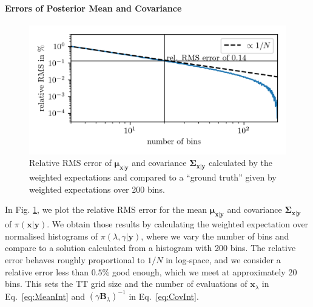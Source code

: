 \paragraph{Errors of Posterior Mean and Covariance}
\begin{figure}[ht!]
	\centering
	\includegraphics{relErrO3MeanVar.png}
	\caption[Relative Error of full posterior mean and covariance.]{Relative RMS error of $\bm{\mu}_{\bm{x}|\bm{y}}$ and covariance $\bm{\Sigma}_{\bm{x}|\bm{y}}$ calculated by the weighted expectations and compared to a ``ground truth'' given by weighted expectations over 200 bins.}
	\label{fig:MeanVarError}
\end{figure}
In Fig. \ref{fig:MeanVarError}, we plot the relative RMS error for the mean $\bm{\mu}_{\bm{x}|\bm{y}}$ and covariance $\bm{\Sigma}_{\bm{x}|\bm{y}}$ of $\pi(\bm{x}|\bm{y})$.
We obtain those results by calculating the weighted expectation over normalised histograms of $\pi(\lambda,\gamma | \bm{y})$, where we vary the number of bins and compare to a solution calculated from a histogram with 200 bins.
The relative error behaves roughly proportional to $1/N$ in log-space, and we consider a relative error less than $0.5\%$ good enough, which we meet at approximately 20 bins.
This sets the TT grid size and the number of evaluations of $\bm{x}_{\lambda}$ in Eq.~\ref{eq:MeanInt} and $(\gamma \bm{B}_{\lambda})^{-1}$ in Eq.~\ref{eq:CovInt}.
\clearpage
